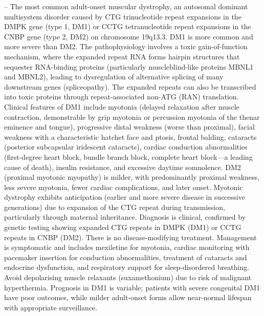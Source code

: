-- The most common adult-onset muscular dystrophy, an autosomal dominant multisystem disorder caused by CTG trinucleotide repeat expansions in the DMPK gene (type 1, DM1) or CCTG tetranucleotide repeat expansions in the CNBP gene (type 2, DM2) on chromosome 19q13.3. DM1 is more common and more severe than DM2. The pathophysiology involves a toxic gain-of-function mechanism, where the expanded repeat RNA forms hairpin structures that sequester RNA-binding proteins (particularly muscleblind-like proteins MBNL1 and MBNL2), leading to dysregulation of alternative splicing of many downstream genes (spliceopathy). The expanded repeats can also be transcribed into toxic proteins through repeat-associated non-ATG (RAN) translation. Clinical features of DM1 include myotonia (delayed relaxation after muscle contraction, demonstrable by grip myotonia or percussion myotonia of the thenar eminence and tongue), progressive distal weakness (worse than proximal), facial weakness with a characteristic hatchet face and ptosis, frontal balding, cataracts (posterior subcapsular iridescent cataracts), cardiac conduction abnormalities (first-degree heart block, bundle branch block, complete heart block—a leading cause of death), insulin resistance, and excessive daytime somnolence. DM2 (proximal myotonic myopathy) is milder, with predominantly proximal weakness, less severe myotonia, fewer cardiac complications, and later onset. Myotonic dystrophy exhibits anticipation (earlier and more severe disease in successive generations) due to expansion of the CTG repeat during transmission, particularly through maternal inheritance. Diagnosis is clinical, confirmed by genetic testing showing expanded CTG repeats in DMPK (DM1) or CCTG repeats in CNBP (DM2). There is no disease-modifying treatment. Management is symptomatic and includes mexiletine for myotonia, cardiac monitoring with pacemaker insertion for conduction abnormalities, treatment of cataracts and endocrine dysfunction, and respiratory support for sleep-disordered breathing. Avoid depolarising muscle relaxants (suxamethonium) due to risk of malignant hyperthermia. Prognosis in DM1 is variable; patients with severe congenital DM1 have poor outcomes, while milder adult-onset forms allow near-normal lifespan with appropriate surveillance.

